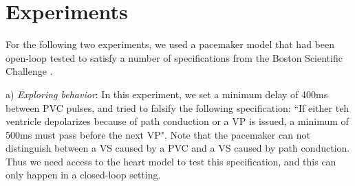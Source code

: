 \section{Experiments}
\label{experiments}


For the following two experiments, we used a pacemaker model that had been open-loop tested to satisfy a number of specifications from the Boston Scientific Challenge \cite{challenge}.

a) \emph{Exploring behavior}: In this experiment, we set a minimum delay of 400ms between PVC pulses, and tried to falsify the following specification:
``If either teh ventricle depolarizes because of path conduction or a VP is issued, a minimum of 500ms must pass before the next VP".
Note that the pacemaker can not distinguish between a VS caused by a PVC and a VS caused by path conduction.
Thus we need access to the heart model to test this specification, and this can only happen in a closed-loop setting.

